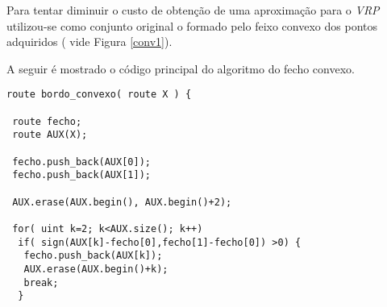 \documentclass[a4paper, 12pt]{article}
\begin{document}
	Para tentar diminuir o custo de obtenção de uma aproximação para o
\emph{VRP} utilizou-se como conjunto original o formado pelo feixo convexo dos
pontos adquiridos ( vide Figura \ref{conv1}).

	A seguir é mostrado o código principal do algoritmo do fecho convexo.

{\small
\begin{verbatim}
route bordo_convexo( route X ) {                                                                                                                                
                                                                                                                                                                
 route fecho;                                                                                                                                                   
 route AUX(X);                                                                                                                                                  
                                                                                                                                                                
 fecho.push_back(AUX[0]);                                                                                                                                       
 fecho.push_back(AUX[1]);                                                                                                                                       
                                                                                                                                                                
 AUX.erase(AUX.begin(), AUX.begin()+2);                                                                                                                         
                                                                                                                                                                
 for( uint k=2; k<AUX.size(); k++)                                                                                                                              
  if( sign(AUX[k]-fecho[0],fecho[1]-fecho[0]) >0) {                                                                                                             
   fecho.push_back(AUX[k]);                                                                                                                                     
   AUX.erase(AUX.begin()+k);                                                                                                                                    
   break;                                                                                                                                                       
  }                                                                                                                                                             
                                                                                                                                                                

\end{verbatim}}
\end{document}

